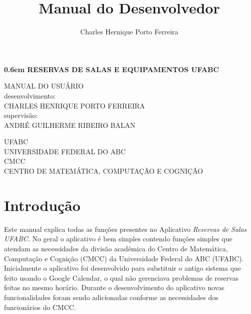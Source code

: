 \documentclass[openany,10pt,a4paper]{book}
\author{Charles Hernique Porto Ferreira}
\title{Manual do Desenvolvedor}
\begin{document}

\clearpage
\newcommand\nbvspace[1][3]{\vspace*{\stretch{#1}}}
\newcommand\nbstretchyspace{\spaceskip0.5em plus 0.25em minus 0.25em}
\newcommand{\nbtitlestretch}{\spaceskip0.6em}
\pagestyle{empty}
\begin{center}
\bfseries
\nbvspace[1]
\Huge
{\nbtitlestretch\huge
RESERVAS DE SALAS E EQUIPAMENTOS UFABC}

\nbvspace[1]
\normalsize

\Large MANUAL DO USUÁRIO\\
\nbvspace[1]
\small desenvolvimento:\\
\normalsize CHARLES HENRIQUE PORTO FERREIRA\\[0.5em]
\small supervisão:\\
\normalsize ANDRÉ GUILHERME RIBEIRO BALAN\\[0.5em]

\nbvspace[2]

\nbvspace[3]
\normalsize

UFABC\\
\large
UNIVERSIDADE FEDERAL DO ABC\\
\normalsize
CMCC\\
\large
CENTRO DE MATEMÁTICA, COMPUTAÇÃO E COGNIÇÃO
\nbvspace[1]
\end{center}
\onehalfspace
\tableofcontents

\chapter{Introdução}
Este manual explica todas as funções presentes no Aplicativo \textit{Reservas de Salas UFABC}. No geral o aplicativo é bem simples contendo funções simples que atendam as necessidades da divisão acadêmica do Centro de Matemática, Computação e Cognição (CMCC) da Universidade Federal do ABC (UFABC). Inicialmente o aplicativo foi desenvolvido para substituir o antigo sistema que feito usando o Google Calendar, o qual não gerenciava problemas de reservas feitas no mesmo horário. Durante o desenvolvimento do aplicativo novas funcionalidades foram sendo adicionadas conforme as necessidades dos funcionários do CMCC.
\end{document}
